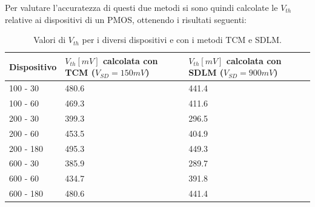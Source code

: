 \documentclass[12pt, letterpaper]{book}
\begin{document}
Per valutare l'accuratezza di questi due metodi si sono quindi calcolate le $V_{th}$ relative ai dispositivi di un PMOS, ottenendo i risultati seguenti:

\begin{table}[H]
  \renewcommand{\arraystretch}{1.3}
  \centering
  \begin{tabular}{m{4.4 cm} m{4.4 cm} m{4.4 cm}}
    \toprule
    Dispositivo & $V_{th} [mV]$ calcolata con TCM ($V_{SD} = 150 mV$) & $V_{th} [mV]$ calcolata con SDLM ($V_{SD} = 900 mV$) \\
    \midrule
    100 - 30    & 480.6                                               & 441.4                                                \\
    \hline
    100 - 60    & 469.3                                               & 411.6                                                \\
    \hline
    200 - 30    & 399.3                                               & 296.5                                                \\
    \hline
    200 - 60    & 453.5                                               & 404.9                                                \\
    \hline
    200 - 180   & 495.3                                               & 449.3                                                \\
    \hline
    600 - 30    & 385.9                                               & 289.7                                                \\
    \hline
    600 - 60    & 434.7                                               & 391.8                                                \\
    \hline
    600 - 180   & 480.6                                               & 441.4                                                \\
    \bottomrule
  \end{tabular}
  \caption{Valori di $V_{th}$ per i diversi dispositivi e con i metodi TCM e SDLM.}
  \label{tab:Iz*}
\end{table}
\end{document}
